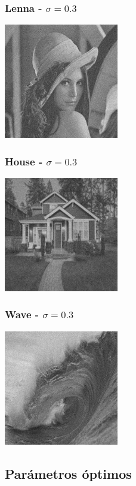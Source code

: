 \documentclass{beamer}
\begin{document}
  \begin{frame}
    \frametitle{ Lenna - $\sigma=0.3$ }
    \centering
    \includegraphics[width=5cm]{imgs/Noise/Lenna.jpg}
  \end{frame}

  \begin{frame}
    \frametitle{ House - $\sigma=0.3$ }  
    \centering
    \includegraphics[width=5cm]{imgs/Noise/House.jpg}
  \end{frame}

  \begin{frame}
    \frametitle{ Wave - $\sigma=0.3$ }
    \centering
    \includegraphics[width=5cm]{imgs/Noise/Wave.jpg}
  \end{frame}

  \subsection{Parámetros óptimos}
\end{document}

